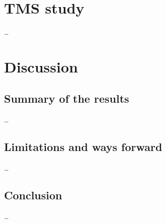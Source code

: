 \documentclass[12pt,]{book}
\theoremstyle{definition}
\theoremstyle{definition}
\theoremstyle{definition}
\theoremstyle{remark}
\begin{document}
\chapter{TMS study}\label{tms-study}

\ldots{}

\chapter{Discussion}\label{discussion-3}

\section{Summary of the results}\label{summary-of-the-results}

\ldots{}

\section{Limitations and ways
forward}\label{limitations-and-ways-forward}

\ldots{}

\section{Conclusion}\label{conclusion}

\ldots{}

\noindent
\setlength{\parindent}{-0.20in} \setlength{\leftskip}{0.20in}
\setlength{\parskip}{8pt}


\end{document}
